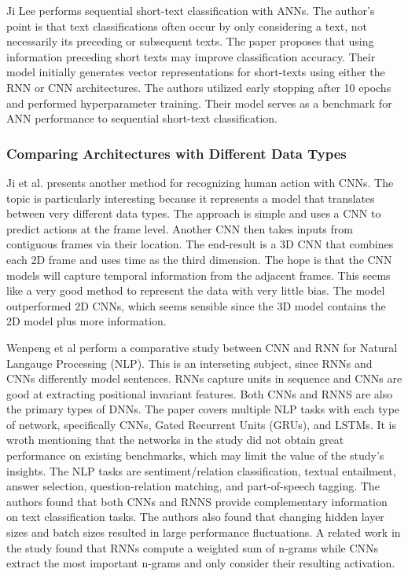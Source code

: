 Ji Lee performs sequential short-text classification with ANNs. The author's point is that text classifications often occur by only considering a text, not necessarily its preceding or subsequent texts.  The paper proposes that using information preceding short texts may improve classification accuracy.  Their model initially generates vector representations for short-texts using either the RNN or CNN architectures.  The authors utilized early stopping after 10 epochs and performed hyperparameter training.  Their model serves as a benchmark for ANN performance to sequential short-text classification.


\subsubsection{Comparing Architectures with Different Data Types}
Ji et al. presents another method for recognizing human action with CNNs.  The topic is particularly interesting because it represents a model that translates between very different data types.   The approach is simple and uses a CNN to predict actions at the frame level.  Another CNN then takes inputs from contiguous frames via their location.  The end-result is a 3D CNN that combines each 2D frame and uses time as the third dimension.  The hope is that the CNN models will capture temporal information from the adjacent frames.  This seems like a very good method to represent the data with very little bias.  The model outperformed 2D CNNs, which seems sensible since the 3D model contains the 2D model plus more information.

Wenpeng et al perform a comparative study between CNN and RNN for Natural Langauge Processing (NLP).  This is an interseting subject, since RNNs and CNNs differently model sentences.  RNNs capture units in sequence and CNNs are good at extracting positional invariant features.  Both CNNs and RNNS are also the primary types of DNNs.  The paper covers multiple NLP tasks with each type of network, specifically CNNs, Gated Recurrent Units (GRUs), and LSTMs.  It is wroth mentioning that the networks in the study did not obtain great performance on existing benchmarks, which may limit the value of the study's insights.  The NLP tasks are sentiment/relation classification, textual entailment, answer selection, question-relation matching, and part-of-speech tagging.  The authors found that both CNNs and RNNS provide complementary information on text classification tasks.  The authors also found that changing hidden layer sizes and batch sizes resulted in large performance fluctuations.  A related work in the study found that RNNs compute a weighted sum of n-grams while CNNs extract the most important n-grams and only consider their resulting activation.

